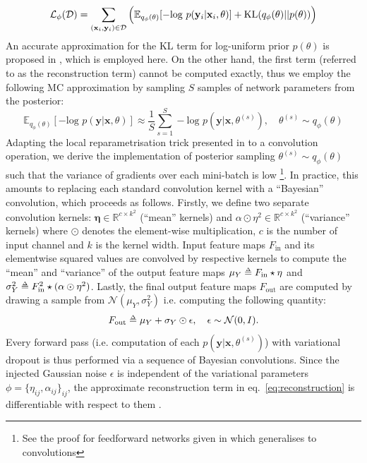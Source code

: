  \begin{equation}
\mathcal{L}_{\phi} (\mathcal{D}) =  \sum_{(\mathbf{x}_i,\mathbf{y}_i)\in\mathcal{D}} \Big{(}  \mathbb{E}_{q_{\phi}(\theta)}[- \text{log }p(\mathbf{y}_i|\mathbf{x}_i,\theta)]   +  \text{KL} (q_{\phi}(\theta)||p(\theta))\Big{)}
 \end{equation}
An accurate approximation for the KL term for log-uniform prior $p(\theta)$ is proposed in \cite{molchanov2017variational}, which is employed here. On the other hand, the first term (referred to as the reconstruction term) cannot be computed exactly, thus we employ the following MC approximation by sampling $S$ samples of network parameters from the posterior:
\begin{equation}\label{eq:reconstruction}
\mathbb{E}_{q_{\phi}(\theta)}[- \text{log }p(\mathbf{y}|\mathbf{x},\theta)] \approx \frac{1}{S}\sum_{s=1}^{S} - \text{log }p(\mathbf{y}|\mathbf{x},\theta^{(s)}), \quad \theta^{(s)} \sim q_{\phi}(\theta)
\end{equation}
Adapting the local reparametrisation trick presented in \cite{kingma2015variational} to a convolution operation, we derive the implementation of posterior sampling $\theta^{(s)} \sim q_{\phi}(\theta)$ such that the variance of gradients over each mini-batch is low \footnote{See the proof for feedforward networks given in  \cite{kingma2015variational} which generalises to convolutions}. In practice, this amounts to replacing each standard convolution kernel with a ``Bayesian'' convolution, which proceeds as follows. Firstly, we define two separate convolution kernels: $\mathbf{\eta} \in \mathbb{R}^{c\times k^2}$ (``mean'' kernels) and $\alpha \odot \eta^{2} \in \mathbb{R}^{c\times k^2}$ (``variance'' kernels) where $ \odot $ denotes the element-wise multiplication, $c$ is the number of input channel and $k$ is the kernel width. Input feature maps $F_{\text{in}}$ and its elementwise squared values are convolved by respective kernels to compute the ``mean'' and ``variance'' of the output feature maps $\mu_{Y}\delequal F_{\text{in}} \star \mathbf{\eta}$ and $\sigma^{2}_{Y} \delequal F_{\text{in}}^2\star (\alpha \odot \eta^{2})$. Lastly, the final output feature maps $F_{\text{out}}$ are computed by drawing a sample from $\mathcal{N}(\mu_{Y}, \sigma^{2}_{Y})$ i.e. computing the following quantity: 
\begin{equation}\label{eq:noise_injection}
F_{\text{out}} \delequal \mu_{Y} +  \sigma_{Y} \odot \mathbf{\epsilon}, \quad \mathbf{\epsilon} \sim \mathcal{N}(0,I).
\end{equation}
Every forward pass (i.e. computation of each $p(\mathbf{y}|\mathbf{x},\theta^{(s)})$) with variational dropout is thus performed via a sequence of Bayesian convolutions.  Since the injected Gaussian noise $\epsilon$ is independent of the variational parameters $\phi=\{\eta_{ij}, \alpha_{ij}\}_{ij}$, the approximate reconstruction term in eq.~\ref{eq:reconstruction} is differentiable with respect to them \cite{kingma2013auto}.  

